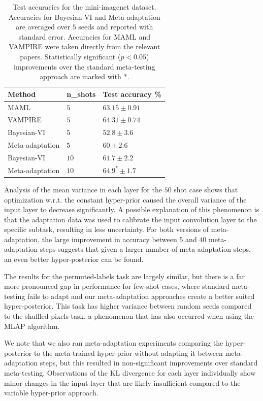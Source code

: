 \documentclass{article} %
\theoremstyle{definition}
\begin{document}
\begin{table}[t]	
	
	\centering
	\begin{tabular}{lll}
		\toprule
		Method   & n\_shots  & Test accuracy \%  \\
		\midrule
		MAML & $5$   & $63.15 \pm 0.91 $      \\
		VAMPIRE & $5$   & $64.31 \pm 0.74 $ \\
		Bayesian-VI & $5$   & $52.8\pm 3.6 $    \\
		Meta-adaptation & $5$   & $60\pm 2.6 $ \\
		\midrule
		Bayesian-VI & $10$   & $61.7\pm 2.2$     \\
		Meta-adaptation & $10$   & $64.9^* \pm 1.7 $  \\
		\midrule
		\bottomrule
	\end{tabular}
	\caption{Test accuracies for the mini-imagenet dataset. Accuracies for Bayesian-VI and Meta-adaptation are averaged over $5$ seeds and reported with standard error. Accuracies for MAML and VAMPIRE were taken directly from the relevant papers. Statistically significant ($p<0.05$) improvements over the standard meta-testing approach are marked with $*$.}
	\label{table:inet}
\end{table}

Analysis of the mean variance in each layer for the $50$ shot case shows that optimization w.r.t.\! the constant hyper-prior caused the overall variance of the input layer to decrease significantly.
A possible explanation of this phenomenon is that the adaptation data was used to calibrate the input convolution layer to the specific subtask, resulting in less uncertainty.
For both versions of meta-adaptation, 
 the large improvement in accuracy between $5$ and $40$ meta-adaptation steps suggests that given a larger number of meta-adaptation steps, an even better hyper-posterior can be found.

The results for the permuted-labels task are largely similar, but there is a far more pronounced gap in performance for few-shot cases, where standard meta-testing fails to adapt and our meta-adaptation approaches create a better suited hyper-posterior. This task has higher variance between random seeds compared to the shuffled-pixels task, a phenomenon that has also occurred when using the MLAP \citep{Amit2018} algorithm.

We note that we also ran meta-adaptation experiments comparing the hyper-posterior to the meta-trained hyper-prior without adapting it between meta-adaptation steps, but this resulted in non-significant improvements over standard meta-testing. Observations of the KL divergence for each layer individually show minor changes in the input layer that are likely insufficient compared to the variable hyper-prior approach.
\end{document}
